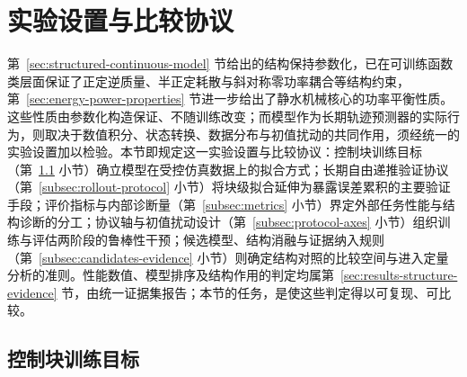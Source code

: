 
\section{实验设置与比较协议}
\label{sec:training-baselines-protocol}

第~\ref{sec:structured-continuous-model} 节给出的结构保持参数化，已在可训练函数类层面保证了正定逆质量、半正定耗散与斜对称零功率耦合等结构约束，第~\ref{sec:energy-power-properties} 节进一步给出了静水机械核心的功率平衡性质。这些性质由参数化构造保证、不随训练改变；而模型作为长期轨迹预测器的实际行为，则取决于数值积分、状态转换、数据分布与初值扰动的共同作用，须经统一的实验设置加以检验。本节即规定这一实验设置与比较协议：控制块训练目标（第~\ref{subsec:training-objective} 小节）确立模型在受控仿真数据上的拟合方式；长期自由递推验证协议（第~\ref{subsec:rollout-protocol} 小节）将块级拟合延伸为暴露误差累积的主要验证手段；评价指标与内部诊断量（第~\ref{subsec:metrics} 小节）界定外部任务性能与结构诊断的分工；协议轴与初值扰动设计（第~\ref{subsec:protocol-axes} 小节）组织训练与评估两阶段的鲁棒性干预；候选模型、结构消融与证据纳入规则（第~\ref{subsec:candidates-evidence} 小节）则确定结构对照的比较空间与进入定量分析的准则。性能数值、模型排序及结构作用的判定均属第~\ref{sec:results-structure-evidence} 节，由统一证据集报告；本节的任务，是使这些判定得以可复现、可比较。

\subsection{控制块训练目标}
\label{subsec:training-objective}


